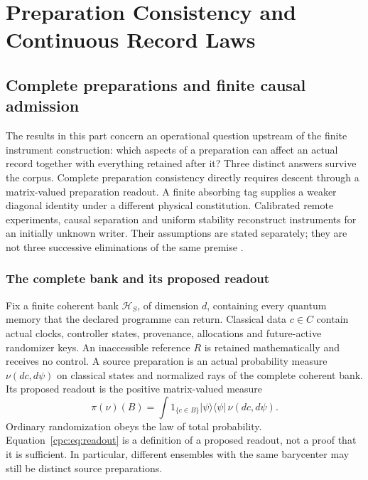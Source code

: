 \documentclass[11pt,oneside,openany]{book}
\theoremstyle{definition}
\theoremstyle{remark}\newtheorem{remark}[theorem]{Remark}
\begin{document}
\part{Preparation Consistency and Continuous Record Laws}\label{part:continuous}

\chapter{Complete preparations and finite causal admission}
\label{cpc:chap:admission}

The results in this part concern an operational question upstream of the finite instrument construction: which aspects of a preparation can affect an actual record together with everything retained after it? Three distinct answers survive the corpus. Complete preparation consistency directly requires descent through a matrix-valued preparation readout. A finite absorbing tag supplies a weaker diagonal identity under a different physical constitution. Calibrated remote experiments, causal separation and uniform stability reconstruct instruments for an initially unknown writer. Their assumptions are stated separately; they are not three successive eliminations of the same premise \cite{M08,M09,M10,M13,M14}.

\section{The complete bank and its proposed readout}

Fix a finite coherent bank $\mathcal H_S$, of dimension $d$, containing every quantum memory that the declared programme can return. Classical data $c\in C$ contain actual clocks, controller states, provenance, allocations and future-active randomizer keys. An inaccessible reference $R$ is retained mathematically and receives no control. A source preparation is an actual probability measure $\nu(dc,d\psi)$ on classical states and normalized rays of the complete coherent bank. Its proposed readout is the positive matrix-valued measure
\begin{equation}
 \pi(\nu)(B)=\int 1_{\{c\in B\}}|\psi\rangle\langle\psi|\,\nu(dc,d\psi).
 \label{cpc:eq:readout}
\end{equation}
Ordinary randomization obeys the law of total probability. Equation~\eqref{cpc:eq:readout} is a definition of a proposed readout, not a proof that it is sufficient. In particular, different ensembles with the same barycenter may still be distinct source preparations.
\end{document}
